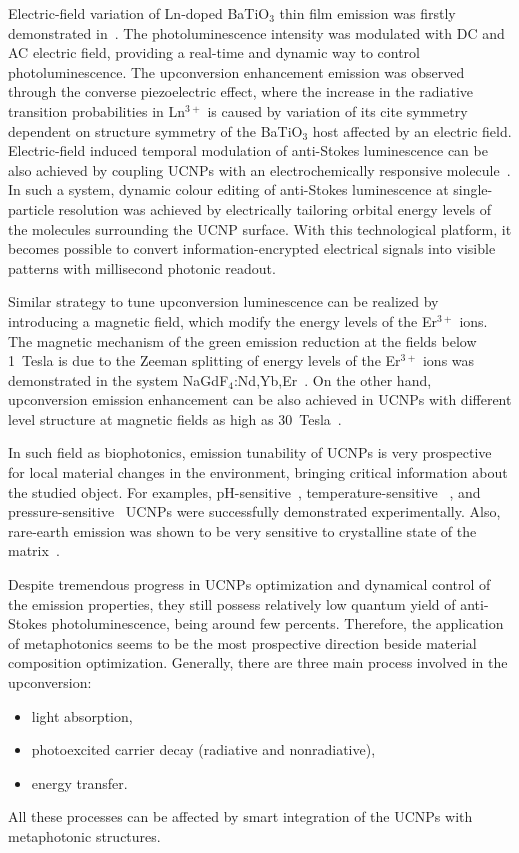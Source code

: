 \documentclass[journal=chreay,manuscript=review]{achemso}
\begin{document}
Electric-field variation of Ln-doped BaTiO$_3$ thin film emission was firstly demonstrated in~\cite{hao2011electric}. The photoluminescence intensity was modulated with DC and AC electric field, providing a real-time and dynamic way to control photoluminescence. The upconversion enhancement emission was observed through the converse piezoelectric effect, where the increase in the radiative transition probabilities in Ln$^{3+}$ is caused by variation of its cite symmetry dependent on structure symmetry of the BaTiO$_3$ host affected by an electric field.
Electric-field induced temporal modulation of anti-Stokes luminescence can be also achieved by coupling UCNPs with an electrochemically responsive molecule~\cite{wu2021dynamic}. In such a system, dynamic colour editing of anti-Stokes luminescence at single-particle resolution was achieved by electrically tailoring orbital energy levels of the molecules surrounding the UCNP surface. With this technological platform, it becomes possible to convert information-encrypted electrical signals into visible patterns with millisecond photonic readout.

Similar strategy to tune upconversion luminescence can be realized by introducing a magnetic field, which modify the energy levels of the Er$^{3+}$ ions. The magnetic mechanism of the green emission reduction at the fields below 1~Tesla is due to the Zeeman splitting of energy levels of the Er$^{3+}$ ions was demonstrated in the system NaGdF$_4$:Nd,Yb,Er~\cite{liu2013magnetic}. On the other hand, upconversion emission enhancement can be also achieved in UCNPs with different level structure at magnetic fields as high as 30~Tesla~\cite{xiao2016dynamically}.

In such field as biophotonics, emission tunability of UCNPs is very prospective for local material changes in the environment, bringing critical information about the studied object. For examples, pH-sensitive~\cite{tsai2019upconversion}, temperature-sensitive ~\cite{fernandez2018continuous}, and pressure-sensitive~\cite{wisser2015strain} UCNPs were successfully demonstrated experimentally. Also, rare-earth emission was shown to be very sensitive to crystalline state of the matrix~\cite{larin2021luminescent}.

Despite tremendous progress in UCNPs optimization and dynamical control of the emission properties, they still possess relatively low quantum yield of anti-Stokes photoluminescence, being around few percents. Therefore, the application of metaphotonics seems to be the most prospective direction beside material composition optimization.   
Generally, there are three main process involved in the upconversion: 
\begin{itemize}
\item{light absorption}, 
\item{photoexcited carrier decay (radiative and nonradiative)},
\item{energy transfer}. 
\end{itemize}
All these processes can be affected by smart integration of the UCNPs with metaphotonic structures. 
\end{document}
